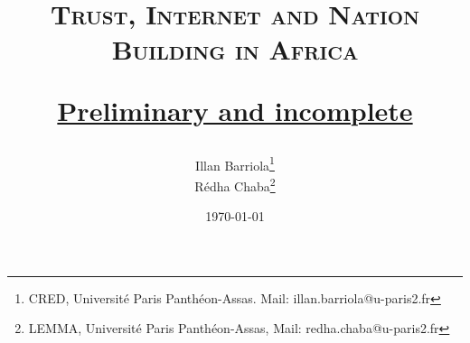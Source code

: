 \documentclass[11pt]{article}
\theoremstyle{plain}
\theoremstyle{plain}
\begin{document}
\title{\textsc{Trust, Internet and Nation Building in Africa}

\vspace{0.75cm} \underline{Preliminary and incomplete }}

\vspace{1cm}
\author{Illan Barriola\footnote{CRED, Université Paris Panthéon-Assas. Mail: illan.barriola@u-paris2.fr}\\ Rédha Chaba\footnote{LEMMA, Université Paris Panthéon-Assas, Mail: redha.chaba@u-paris2.fr}}


\date{ \today}

\maketitle

\onehalfspacing
\end{document}
